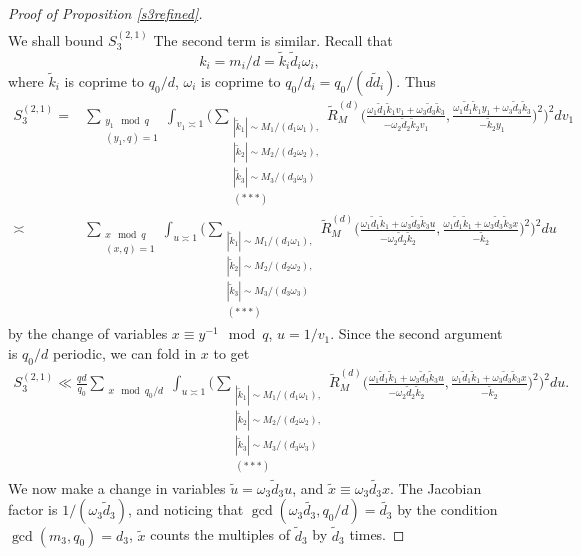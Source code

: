 \begin{proof}[Proof of Proposition \ref{s3refined}]
\begin{align*}
    \end{align*}
    We shall bound $ S_3^{(2,1)}$ The second term is similar. 
    Recall that \[
        k_i = m_i/d = \tilde{k}_i \tilde{d}_i \omega_i,
    \]  
    where $\tilde{k}_i$ is coprime to $q_0/d$, $\omega_i$ is coprime to $q_0/d_i = q_0/(d\tilde{d}_i)$.
    Thus 
    \begin{align*}
        S_3^{(2,1)}=&\sum_{\substack{y_1\mod q\\ (y_1,q)=1} }\int_{v_1\asymp 1}\Bigg(\sum_{\substack{|\tilde{k}_1|\sim M_1/(d_1\omega_1),\\|\tilde{k}_2|\sim M_2/(d_2\omega_2),\\|\tilde{k}_3|\sim M_3/(d_3\omega_3)\\
        (***)}}
        \tilde{R}_M^{(d)}\Big(\frac{\omega_1\tilde{d}_1\tilde{k}_1v_1+\omega_3\tilde{d}_3\tilde{k}_3}{-\omega_2\tilde{d}_2\tilde{k}_2v_1},\frac{\omega_1\tilde{d}_1\tilde{k}_1y_1+\omega_3\tilde{d}_3\tilde{k}_3}{-\tilde{k}_2y_1}\Big)^2\Bigg)^2 dv_1
        \\
        \asymp& \sum_{\substack{x \mod q\\ (x,q)=1} }\int_{u\asymp 1}\Bigg(\sum_{\substack{|\tilde{k}_1|\sim M_1/(d_1\omega_1),\\|\tilde{k}_2|\sim M_2/(d_2\omega_2),\\|\tilde{k}_3|\sim M_3/(d_3\omega_3)\\
        (***)}}
        \tilde{R}_M^{(d)}\Big(\frac{\omega_1\tilde{d}_1\tilde{k}_1+\omega_3\tilde{d}_3\tilde{k}_3u}{-\omega_2\tilde{d}_2\tilde{k}_2},\frac{\omega_1\tilde{d}_1\tilde{k}_1+\omega_3\tilde{d}_3\tilde{k}_3 x}{-\tilde{k}_2}\Big)^2\Bigg)^2 du
    \end{align*}
    by the change of variables $x\equiv y^{-1}\mod q$, $u=1/v_1$.
    Since the second argument is $q_0/d$ periodic, we can fold in $x$ to get \begin{align*}
        S_3^{(2,1)}\ll
        \frac{qd}{q_0} \sum_{\substack{x \mod q_0/d} }\int_{u\asymp 1}\Bigg(\sum_{\substack{|\tilde{k}_1|\sim M_1/(d_1\omega_1),\\|\tilde{k}_2|\sim M_2/(d_2\omega_2),\\|\tilde{k}_3|\sim M_3/(d_3\omega_3)\\
        (***)}}
        \tilde{R}_M^{(d)}\Big(\frac{\omega_1\tilde{d}_1\tilde{k}_1+\omega_3\tilde{d}_3\tilde{k}_3u}{-\omega_2\tilde{d}_2\tilde{k}_2},\frac{\omega_1\tilde{d}_1\tilde{k}_1+\omega_3\tilde{d}_3\tilde{k}_3 x}{-\tilde{k}_2}\Big)^2\Bigg)^2 du.
    \end{align*}
    We now make a change in variables $\tilde{u} = \omega_3\tilde{d}_3u$, and $\tilde{x}\equiv \omega_3\tilde{d_3}x$. The Jacobian factor is $1/(\omega_3\tilde{d}_3)$, and noticing that $\gcd(\omega_3\tilde{d_3},q_0/d) = \tilde{d_3}$ by the condition $\gcd(m_3,q_0) =d_3$, $\tilde{x}$ counts the multiples of $\tilde{d}_3$ by $\tilde{d}_3$ times.

\end{proof}
